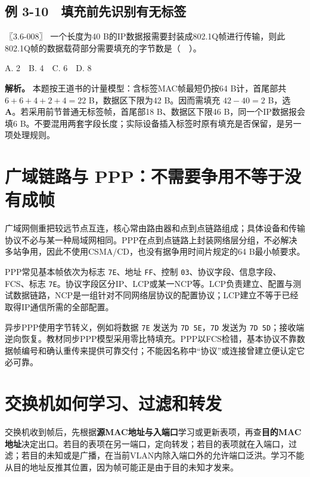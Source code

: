 \subsection{例 3-10　填充前先识别有无标签}\label{cn-ex3-10}

\noindent{}〖3.6-008〗 一个长度为40 B的IP数据报需要封装成802.1Q帧进行传输，则此802.1Q帧的数据载荷部分需要填充的字节数是（　）。

A. 2　B. 4　C. 6　D. 8


\textbf{解析。} 本题按王道书的计量模型：含标签MAC帧最短仍按64 B计，首尾部共 \(6+6+4+2+4=22\) B，数据区下限为42 B。因而需填充 \(42-40=2\) B，选 \textbf{A}。若采用前节普通无标签帧，首尾部18 B、数据区下限46 B，同一个IP数据报会填6 B。不要混用两套字段长度；实际设备插入标签时原有填充是否保留，是另一项处理规则。

\section{广域链路与 PPP：不需要争用不等于没有成帧}\label{cn-03-18}

广域网侧重把较远节点互连，核心常由路由器和点到点链路组成；具体设备和传输协议不必与某一种局域网相同。PPP在点到点链路上封装网络层分组，不必解决多站争用，因此不使用CSMA/CD，也没有据争用时间片规定的64 B最小帧要求。

PPP常见基本帧依次为标志 \allowbreak{}\texttt{7E}、地址 \allowbreak{}\texttt{FF}、控制 \allowbreak{}\texttt{03}、协议字段、信息字段、FCS、标志 \allowbreak{}\texttt{7E}。协议字段区分IP、LCP或某一NCP等。LCP负责建立、配置与测试数据链路，NCP是一组针对不同网络层协议的配置协议；LCP建立不等于已经取得IP通信所需的全部配置。

异步PPP使用字节转义，例如将数据 \allowbreak{}\texttt{7E} 发送为 \allowbreak{}\texttt{7D\ 5E}，\allowbreak{}\texttt{7D} 发送为 \allowbreak{}\texttt{7D\ 5D}；接收端逆向恢复。教材同步PPP模型采用零比特填充。PPP以FCS检错，基本协议不靠数据帧编号和确认重传来提供可靠交付；不能因名称中``协议''或连接曾建立便认定它必可靠。

\section{交换机如何学习、过滤和转发}\label{cn-03-19}

交换机收到帧后，先根据\textbf{源MAC地址与入端口}学习或更新表项，再查\textbf{目的MAC地址}决定出口。若目的表项在另一端口，定向转发；若目的表项就在入端口，过滤；若目的未知或是广播，在当前VLAN内除入端口外的允许端口泛洪。学习不能从目的地址反推其位置，因为帧可能正是由于目的未知才发来。

